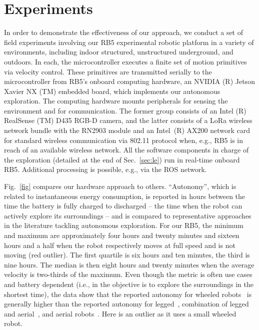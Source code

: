 \documentclass[letterpaper,10pt,conference,twoside]{IEEEtran}
\theoremstyle{definition}
\begin{document}
\section{Experiments}
\label{sec:fe}
\noindent
In order to demonstrate the effectiveness of our approach, we conduct a set of 
field experiments %
involving our RB5 experimental robotic platform %
in a variety of environments, including indoor structured, unstructured underground, and outdoors. In each, the microcontroller executes a finite set of motion primitives via velocity control. These primitives are transmitted serially to the microcontroller 
from RB5's onboard computing hardware, an NVIDIA (R) Jetson Xavier NX (TM) embedded board, which implements our autonomous %
exploration. %
The computing hardware mounts peripherals for sensing the environment and for communication. The former group consists of %
an Intel (R) RealSense (TM) D435 RGB-D camera, and the latter 
consists 
of a LoRa wireless network bundle with the RN2903 module and an Intel~(R) AX200 network card for standard wireless communication via 802.11 protocol when, e.g., RB5 is in reach of an available wireless network.
%
All the software components in charge of the exploration %
(detailed at the end of Sec.~\ref{sec:le}) run in real-time onboard RB5. Additional processing is possible, e.g., %
via the ROS network.

Fig.~\ref{fig} compares our hardware approach to others. 
``Autonomy'', which is related to instantaneous energy consumption, is reported in hours between the time the battery is fully charged to discharged -- the time when the robot can actively explore its surroundings -- and is compared to representative approaches in the literature tackling autonomous exploration. For our RB5, the minimum and maximum are approximately four hours and twenty minutes and sixteen hours and a half when the robot respectively moves at full speed and is not moving (red outlier). The first quartile is six hours and ten minutes, the third is nine hours. The median is then eight hours and twenty minutes when the average velocity is two-thirds of the maximum. Even though the metric is often use cases and battery dependent (i.e., in \cite{roucek2020darpa,tranzatto2022cerberus} the objective is to explore the surroundings in the shortest time), the data show that the reported autonomy for wheeled robots~\cite{muller2021openbot,roucek2020darpa,surmann2003autonomous} is generally higher than the reported autonomy for legged~\cite{tranzatto2022cerberus}, combination of legged and aerial~\cite{kulkarni2022autonomous}, and aerial robots~\cite{schmid2020efficient}.
Here \cite{muller2021openbot} is an outlier as it uses a small wheeled robot.
\end{document}
